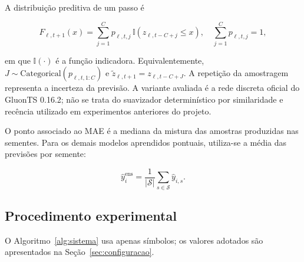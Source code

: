 \documentclass[10pt,conference,a4paper]{IEEEtran}
\begin{document}
A distribuição preditiva de um passo é

\begin{equation}
  \widehat F_{\ell,t+1}(x)
  =\sum_{j=1}^{C}p_{\ell,t,j}\,
  \mathbb{I}\!\left(z_{\ell,t-C+j}\leq x\right),
  \quad \sum_{j=1}^{C}p_{\ell,t,j}=1,
  \label{eq:deepnpts_dist}
\end{equation}

\noindent em que $\mathbb{I}(\cdot)$ é a função indicadora. Equivalentemente,
$J\sim\mathrm{Categorical}(p_{\ell,t,1:C})$ e
$\widetilde z_{\ell,t+1}=z_{\ell,t-C+J}$. A repetição da amostragem representa
a incerteza da previsão. A variante avaliada é a rede discreta oficial do
GluonTS 0.16.2; não se trata do suavizador determinístico por similaridade e
recência utilizado em experimentos anteriores do projeto.

O ponto associado ao MAE é a mediana da mistura das amostras produzidas nas
sementes. Para os demais modelos aprendidos pontuais, utiliza-se a média das
previsões por semente:

\begin{equation}
 \widehat y_i^{\mathrm{ens}}=\frac{1}{|\mathcal S|}
 \sum_{s\in\mathcal S}\widehat y_{i,s}.
 \label{eq:ensemble}
\end{equation}

\subsection{Procedimento experimental}

O Algoritmo~\ref{alg:sistema} usa apenas símbolos; os valores adotados são
apresentados na Seção~\ref{sec:configuracao}.
\end{document}
